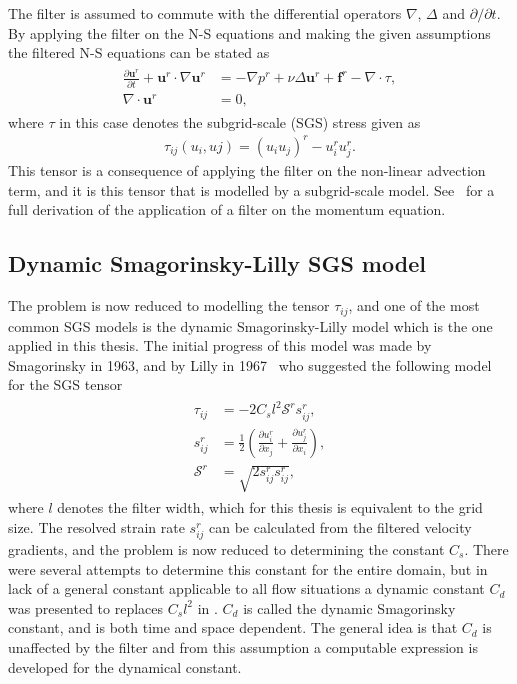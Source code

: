 The filter is assumed to commute with 
the differential operators $\nabla$, $\Delta$ and $\partial / \partial t$. By applying the filter on the N-S equations
and making the given assumptions the filtered N-S equations can be stated as 
%
\begin{align}
    \begin{split}
        \frac{\partial \mathbf{u}^r}{\partial t} + \mathbf{u}^r\cdot \nabla\mathbf{u}^r
        &= -\nabla p^r +\nu\Delta \mathbf{u}^r+\mathbf{f}^r-\nabla \cdot \tau, \\
        \nabla \cdot \mathbf{u}^r &= 0,
    \end{split}
	\label{eq:NSfiltered}
\end{align}
%
where $\tau$ in this case denotes the subgrid-scale (SGS) stress given as 
\begin{align}
    \tau_{ij}(u_i,uj) = (u_iu_j)^r -u_i^ru_j^r.
    \label{eq:sgstensor}
\end{align}
%
This tensor is a consequence of applying the filter on the non-linear advection term, 
and it is this tensor that is modelled by a subgrid-scale model. See~\cite{Pope} for a full derivation of the 
application of a filter on the momentum equation. 

\subsection{Dynamic Smagorinsky-Lilly SGS model}
The problem is now reduced to modelling the tensor $\tau_{ij}$, and one of the most common SGS models is the 
dynamic Smagorinsky-Lilly model which is the one applied in this thesis. 
The initial progress of this model was made by Smagorinsky in 1963,
and by Lilly in 1967~\cite{Lilly67} who suggested the following model for the SGS tensor
%
\begin{align}
    \begin{split}
    \tau_{ij} &= -2C_sl^2\mathcal{S}^rs_{ij}^r,\\
    s^r_{ij} &= \frac{1}{2}\left( \frac{\partial u^r_i}{\partial x_j} +
    \frac{\partial u^r_j}{\partial x_i}\right),\\
    \mathcal{S}^r &= \sqrt{2s^r_{ij}s^r_{ij}},
    \end{split}
    \label{eq:boussinesq}
\end{align}
%
where $l$ denotes the filter width, which for this thesis is equivalent to the grid size.
The resolved strain rate $s^r_{ij}$ can be calculated from the filtered velocity gradients, and the problem is now reduced to determining
the constant $C_s$. There were several attempts to determine this constant for the entire domain, but in lack of a general 
constant applicable to all flow situations a dynamic constant $C_d$ was presented to replaces $C_sl^2$ in .
$C_d$ is called the dynamic Smagorinsky constant, and is both time and space dependent.
The general idea is that $C_d$ is unaffected by the filter and from this 
assumption a computable expression is developed for the dynamical constant.

